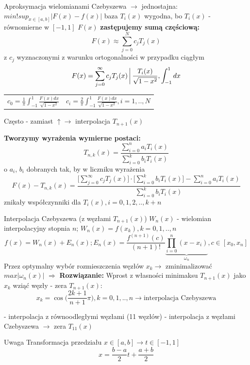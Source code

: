 \begin{frame}{Aproksymacja wielomianami Czebyszewa}
	$\rightarrow$ jednostajna: $min!sup_{x \in [a,b]}|F(x)-f(x)|$ \newline
    baza $T_i(x)$ wygodna, bo $T_i(x)$ - równomierne w $[-1,1]$ \newline
    $F(x)$ \textbf{zastępujemy sumą częściową:}
    $$F(x) \approx \sum_{j=0}^{N}c_jT_j(x)$$
    z $c_j$ wyznaczonymi z warunku ortogonalności w przypadku ciągłym
    $$F(x) = \sum_{j=0}^{\infty}c_jT_j(x)\bigg\arrowvert \frac{T_i(x)}{\sqrt{1-x^2}},\int_{-1}^{1}dx$$
    \begin{tabular}{ll}
    $c_0 = \frac{1}{\pi}\int_{-1}^{1}\frac{F(x)dx}{\sqrt{1-x^2}}$ &
    $c_i = \frac{2}{\pi}\int_{-1}^{1}\frac{F(x)dx}{\sqrt{1-x^2}}, i=1,..,N$
    \end{tabular}
    
    Często - zamiast $\uparrow \rightarrow$ interpolacja $T_{n+1}(x)$
\end{frame}
\begin{frame}
	\textbf{Tworzymy wyrażenia wymierne postaci:}
    $$T_{n,k}(x) = \frac{\sum_{i=0}^{n}a_iT_i(x)}{\sum_{i=0}^{k}b_iT_i(x)}$$
    o $a_i$, $b_i$ dobranych tak, by w liczniku wyrażenia 
    $$F(x)-T_{n,k}(x) = \frac{\big[\sum_{j=0}^{\infty}c_jT_j(x)\big] \cdot \big[\sum_{i=0}^{k}b_iT_i(x)\big] - \sum_{i=0}^{n}a_iT_i(x)}{\sum_{i=0}^{k}b_iT_i(x)}$$
    znikały współczynniki dla $T_i(x),i=0,1,2,..,k+n$
\end{frame}
\begin{frame}{Interpolacja Czebyszewa (z węzłami $T_{n+1}(x)$)}
	$W_n(x)$ - wielomian interpolacyjny stopnia $n$; $W_n(x) = f(x_k),k=0,1,..,n$
    $$f(x) = W_n(x)+E_n(x); E_n(x) = \frac{f^{(n+1)}(c)}{(n+1)!}\underbrace{\prod_{i=0}^{n}(x-x_i)}_{\omega_n}
	, c \in [x_0,x_n]$$
    Przez optymalny wybór rozmieszczenia węzłów $x_k \rightarrow$ zminimalizować $max|\omega_n(x)|$\newline
    $\Rightarrow$ \textbf{Rozwiązanie:} Wprost z własności minimaksu $T_{n+1}(x)$ jako $x_k$ wziąć węzły - zera $T_{n+1}(x)$:
    $$x_k = \cos \Big(\frac{2k+1}{n+1}\pi\Big), k=0,1,..,n \rightarrow \text{interpolacja Czebyszewa}$$
    
\end{frame}
\begin{frame}
	- interpolacja z równoodległymi węzłami (11 węzłów)\newline
    - interpolacja z węzłami Czebyszewa $\rightarrow$ zera $T_{11}(x)$
    \begin{block}{Uwaga}
    Transformacja przedziału $x \in [a,b] \rightarrow t \in [-1,1]$
    $$x=\frac{b-a}{2}t+\frac{a+b}{2}$$
    \end{block}
\end{frame}

